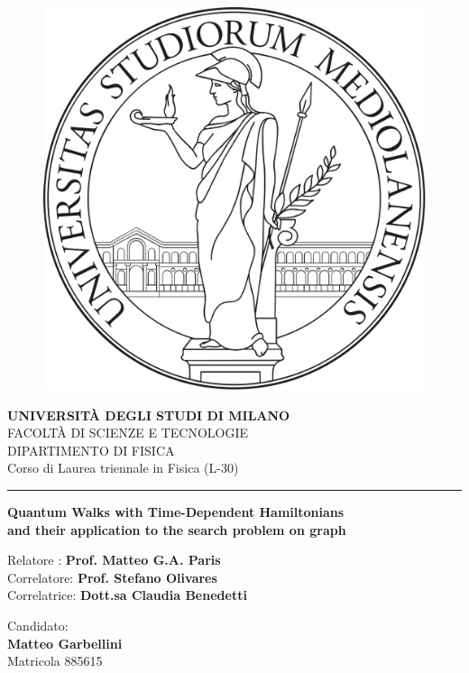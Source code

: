 \documentclass[11pt, twoside]{report}
\begin{document}
\begin{titlepage}
    \begin{center}
        \begin{figure}[hbt!]
             \centering
             \includegraphics[width=0.4 \textwidth]{./figures/unimi_logo_tesi}
        \end{figure}
        \textbf{\Large{UNIVERSIT\`A DEGLI STUDI DI MILANO}}\\
        \vspace{12pt}
        \Large{FACOLT\`A DI SCIENZE E TECNOLOGIE}\\
        \Large{DIPARTIMENTO DI FISICA}\\
        \Large{Corso di Laurea triennale in Fisica (L-30)}
        \vspace{24pt}
        \hrule
        \vspace{24pt}
        \textbf{\Large{Quantum Walks with Time-Dependent Hamiltonians}\\ \large{and their application to the search problem on graph}} \\

    \end{center}
    \vspace{120pt}
    \begin{flushleft}
        Relatore :
        \textbf{Prof. Matteo G.A. Paris}\\
        Correlatore:
        \textbf{Prof. Stefano Olivares}\\
        Correlatrice:
        \textbf{Dott.sa Claudia Benedetti}
    \end{flushleft}
    \vspace{12pt}
    \begin{flushright}
        Candidato:\\
        \textbf{Matteo Garbellini}\\
        Matricola 885615\\
    \end{flushright}
\end{titlepage}
\newpage
\end{document}
